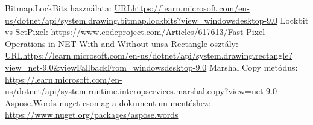 \documentclass[]{thesis-ekf}
\theoremstyle{definition}
\theoremstyle{remark}
\begin{document}
\begin{thebibliography}{9}
 Bitmap.LockBits használata: \url{URLhttps://learn.microsoft.com/en-us/dotnet/api/system.drawing.bitmap.lockbits?view=windowsdesktop-9.0}
 Lockbit vs SetPixel: \url{https://www.codeproject.com/Articles/617613/Fast-Pixel-Operations-in-NET-With-and-Without-unsa}
 Rectangle osztály: \url{URLhttps://learn.microsoft.com/en-us/dotnet/api/system.drawing.rectangle?view=net-9.0&viewFallbackFrom=windowsdesktop-9.0}
 Marshal Copy metódus: \url{https://learn.microsoft.com/en-us/dotnet/api/system.runtime.interopservices.marshal.copy?view=net-9.0}
 Aspose.Words nuget csomag a dokumentum mentéshez:  \url{https://www.nuget.org/packages/aspose.words}
\end{thebibliography}


\end{document}
